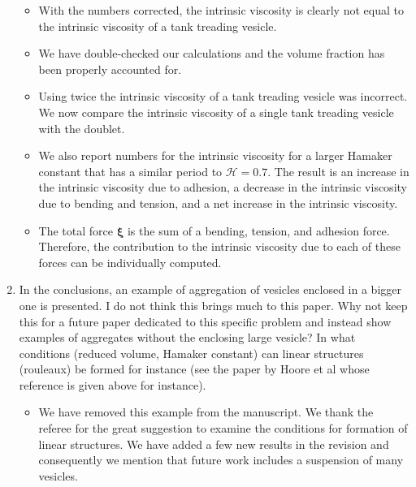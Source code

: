 \documentclass[11pt]{article}
\newcommand{\comment}[1]{{\color{blue} #1}}
\newcommand{\xxi}{\boldsymbol{\xi}}
\begin{document}
\begin{enumerate}
\begin{itemize}
  \item With the numbers corrected, the intrinsic viscosity is clearly
    not equal to the intrinsic viscosity of a tank treading vesicle.

  \item We have double-checked our calculations and the volume fraction
    has been properly accounted for.

  \item Using twice the intrinsic viscosity of a tank treading vesicle
    was incorrect.  We now compare the intrinsic viscosity of a single
    tank treading vesicle with the doublet.

  \item We also report numbers for the intrinsic viscosity for a larger
    Hamaker constant that has a similar period to $\mathcal{H} = 0.7$.
    The result is an increase in the intrinsic viscosity due to
    adhesion, a decrease in the intrinsic viscosity due to bending and
    tension, and a net increase in the intrinsic viscosity.

  \item The total force $\xxi$ is the sum of a bending, tension, and
    adhesion force.  Therefore, the contribution to the intrinsic
    viscosity due to each of these forces can be individually computed.
\end{itemize}

\item\comment{In the conclusions, an example of aggregation of vesicles
  enclosed in a bigger one is presented. I do not think this brings much
  to this paper. Why not keep this for a future paper dedicated to this
  specific problem and instead show examples of aggregates without the
  enclosing large vesicle? In what conditions (reduced volume, Hamaker
  constant) can linear structures (rouleaux) be formed for instance (see
  the paper by Hoore et al whose reference is given above for
  instance).}
\begin{itemize}
  \item We have removed this example from the manuscript.  We thank the
    referee for the great suggestion to examine the conditions for
    formation of linear structures. We have added a few new results in
    the revision and consequently we mention that future work includes a
    suspension of many vesicles.
\end{itemize}

\end{enumerate}
\end{document}
